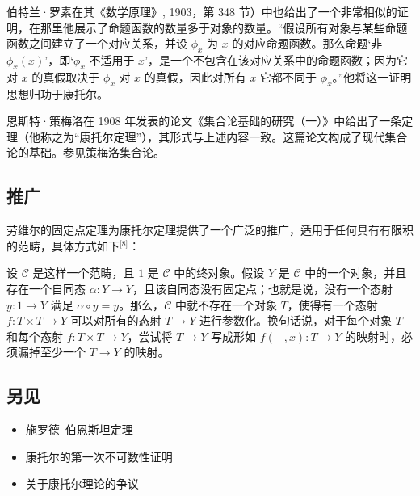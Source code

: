 伯特兰·罗素在其《数学原理》, 1903，第 348 节）中也给出了一个非常相似的证明，在那里他展示了命题函数的数量多于对象的数量。“假设所有对象与某些命题函数之间建立了一个对应关系，并设 $\phi_x$ 为 $x$ 的对应命题函数。那么命题‘非 $\phi_x(x)$’，即‘$\phi_x$ 不适用于 $x$’，是一个不包含在该对应关系中的命题函数；因为它对 $x$ 的真假取决于 $\phi_x$ 对 $x$ 的真假，因此对所有 $x$ 它都不同于 $\phi_x$。”他将这一证明思想归功于康托尔。

恩斯特·策梅洛在 1908 年发表的论文《集合论基础的研究（一）》中给出了一条定理（他称之为“康托尔定理”），其形式与上述内容一致。这篇论文构成了现代集合论的基础。参见策梅洛集合论。
\subsection{推广}
劳维尔的固定点定理为康托尔定理提供了一个广泛的推广，适用于任何具有有限积的范畴，具体方式如下\(^\text{[8]}\)：

设 $\mathcal{C}$ 是这样一个范畴，且 $1$ 是 $\mathcal{C}$ 中的终对象。假设 $Y$ 是 $\mathcal{C}$ 中的一个对象，并且存在一个自同态 $\alpha : Y \to Y$，且该自同态没有固定点；也就是说，没有一个态射 $y : 1 \to Y$ 满足 $\alpha \circ y = y$。那么，$\mathcal{C}$ 中就不存在一个对象 $T$，使得有一个态射 $f : T \times T \to Y$ 可以对所有的态射 $T \to Y$ 进行参数化。换句话说，对于每个对象 $T$ 和每个态射 $f : T \times T \to Y$，尝试将 $T \to Y$ 写成形如 $f(-,x) : T \to Y$ 的映射时，必须漏掉至少一个 $T \to Y$ 的映射。
\subsection{另见}
\begin{itemize}
\item 施罗德–伯恩斯坦定理
\item 康托尔的第一次不可数性证明
\item 关于康托尔理论的争议
\end{itemize}
